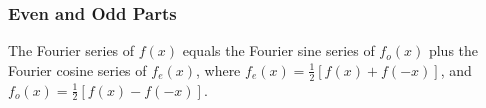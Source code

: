        \subsubsection{Even and Odd Parts}
        \begin{thm}
            The Fourier series of $f(x)$ equals the Fourier sine series of $f_o(x)$ plus the Fourier cosine series of
            $f_e(x)$, where $f_e(x) = \frac{1}{2} [f(x) + f(-x)]$, and $f_o(x) = \frac{1}{2} [f(x) - f(-x)]$.
        \end{thm}


